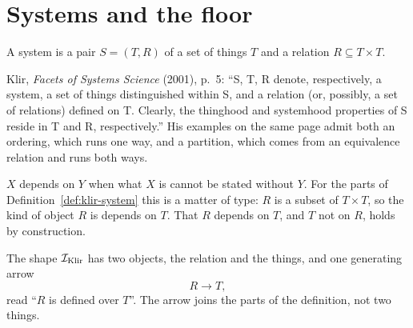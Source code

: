 
\chapter{Systems and the floor}

\begin{definition}[System]
  \label{def:klir-system}
  \leanok
  A system is a pair $S = (T, R)$ of a set of things $T$ and a relation
  $R \subseteq T \times T$.
\end{definition}

\begin{remark}
  Klir, \emph{Facets of Systems Science} (2001), p.~5: ``S, T, R denote,
  respectively, a system, a set of things distinguished within S, and a
  relation (or, possibly, a set of relations) defined on T. Clearly, the
  thinghood and systemhood properties of S reside in T and R, respectively.''
  His examples on the same page admit both an ordering, which runs one way,
  and a partition, which comes from an equivalence relation and runs both ways.
\end{remark}

\begin{definition}[Dependency]
  \label{def:dependency}
  $X$ depends on $Y$ when what $X$ is cannot be stated without $Y$. For the
  parts of Definition~\ref{def:klir-system} this is a matter of type: $R$ is
  a subset of $T \times T$, so the kind of object $R$ is depends on $T$. That
  $R$ depends on $T$, and $T$ not on $R$, holds by construction.
\end{definition}

\begin{definition}
  \label{def:klir-shape}
  \leanok
  The shape $\mathcal{I}_{\mathrm{Klir}}$ has two objects, the relation and the things, and one
  generating arrow
  \[
    R \longrightarrow T,
  \]
  read ``$R$ is defined over $T$''. The arrow joins the parts of the
  definition, not two things.
\end{definition}

